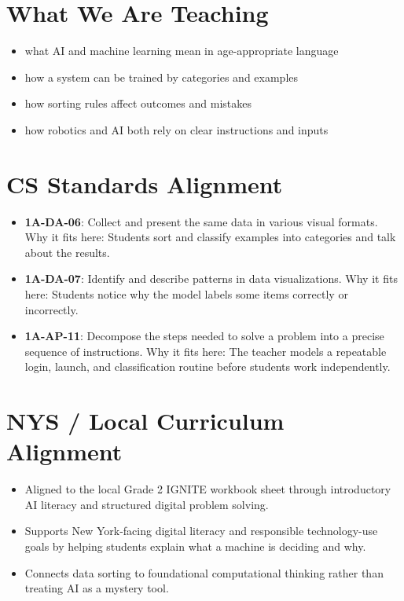 \documentclass[11pt]{article}
\begin{document}
\section*{What We Are Teaching}
\begin{itemize}[leftmargin=*]
\item what AI and machine learning mean in age-appropriate language
\item how a system can be trained by categories and examples
\item how sorting rules affect outcomes and mistakes
\item how robotics and AI both rely on clear instructions and inputs
\end{itemize}

\section*{CS Standards Alignment}
\begin{itemize}[leftmargin=*]
\item \textbf{1A-DA-06}: Collect and present the same data in various visual formats. Why it fits here: Students sort and classify examples into categories and talk about the results.
\item \textbf{1A-DA-07}: Identify and describe patterns in data visualizations. Why it fits here: Students notice why the model labels some items correctly or incorrectly.
\item \textbf{1A-AP-11}: Decompose the steps needed to solve a problem into a precise sequence of instructions. Why it fits here: The teacher models a repeatable login, launch, and classification routine before students work independently.
\end{itemize}

\section*{NYS / Local Curriculum Alignment}
\begin{itemize}[leftmargin=*]
\item Aligned to the local Grade 2 IGNITE workbook sheet through introductory AI literacy and structured digital problem solving.
\item Supports New York-facing digital literacy and responsible technology-use goals by helping students explain what a machine is deciding and why.
\item Connects data sorting to foundational computational thinking rather than treating AI as a mystery tool.
\end{itemize}
\end{document}
